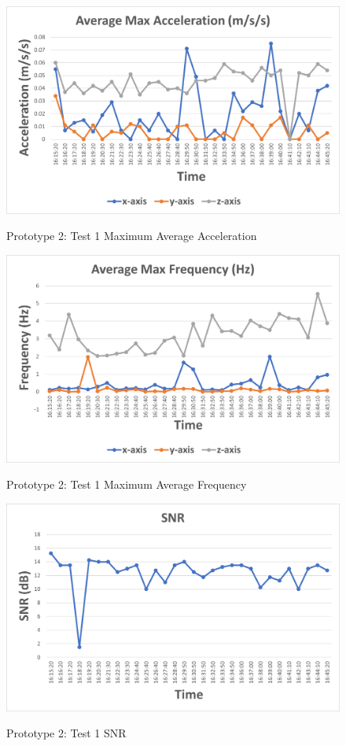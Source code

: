 \begin{figure}[H]
	\centering
	\caption{Prototype 2: Test 1 Maximum Average Acceleration}
	\includegraphics[width=\textwidth]{Sections/Prototype-Testing/proto2-test1-a.png}
	\label{proto2-test1-a}
\end{figure}

\begin{figure}[H]
	\centering
	\caption{Prototype 2: Test 1 Maximum Average Frequency}
	\includegraphics[width=\textwidth]{Sections/Prototype-Testing/proto2-test1-f.png}
	\label{proto2-test1-f}
\end{figure}

\begin{figure}[H]
	\centering
	\caption{Prototype 2: Test 1 SNR}
	\includegraphics[width=\textwidth]{Sections/Prototype-Testing/proto2-test1-snr.png}
	\label{proto2-test1-snr}
\end{figure}

